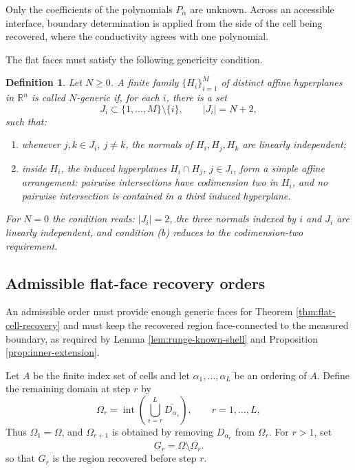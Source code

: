 \documentclass[11pt,oneside]{article}
\newtheorem{definition}[theorem]{Definition}
\newcommand{\R}{\mathbb R}
\begin{document}
Only the coefficients of the polynomials \(P_\alpha\) are unknown.  Across an
accessible interface, boundary determination is applied from the side of the
cell being recovered, where the conductivity agrees with one polynomial.


The flat faces must satisfy the following genericity condition.


\begin{definition}
\label{def:N-generic}
Let \(N\ge0\).  A finite family \(\{H_i\}_{i=1}^M\) of distinct affine
hyperplanes in \(\R^n\) is called \(N\)-generic if, for each \(i\), there is a
set
\begin{equation}
  J_i\subset \{1,\ldots,M\}\setminus\{i\},
  \qquad |J_i|=N+2,
\end{equation}
such that:
\begin{enumerate}[label=(\alph*)]
  \item whenever \(j,k\in J_i\), \(j\ne k\), the normals of
  \(H_i,H_j,H_k\) are linearly independent;
  \item inside \(H_i\), the induced hyperplanes
  \(H_i\cap H_j\), \(j\in J_i\), form a simple affine arrangement: pairwise
  intersections have codimension two in \(H_i\), and no pairwise intersection
  is contained in a third induced hyperplane.
\end{enumerate}
For \(N=0\) the condition reads: \(|J_i|=2\), the three normals indexed by
\(i\) and \(J_i\) are linearly independent, and condition (b) reduces to the
codimension-two requirement.
\end{definition}


\subsection{Admissible flat-face recovery orders}
\label{sec:admissible-order}

An admissible order must provide enough generic faces for Theorem
\ref{thm:flat-cell-recovery} and must keep the recovered region
face-connected to the measured boundary, as required by Lemma
\ref{lem:runge-known-shell} and Proposition \ref{prop:inner-extension}.

Let \(A\) be the finite index set of cells and let
\(\alpha_1,\ldots,\alpha_L\) be an ordering of \(A\).  Define the remaining
domain at step \(r\) by
\begin{equation}
  \Omega_r=\operatorname{int}\left(
  \bigcup_{s=r}^L \overline{D_{\alpha_s}}\right),
  \qquad r=1,\ldots,L,
  \label{eq:remaining-domain}
\end{equation}
Thus \(\Omega_1=\Omega\), and \(\Omega_{r+1}\) is obtained by removing
\(D_{\alpha_r}\) from \(\Omega_r\).  For \(r>1\), set
\begin{equation}
  G_r=\Omega\setminus\overline{\Omega_r}.
\end{equation}
so that \(G_r\) is the region recovered before step \(r\).
\end{document}
